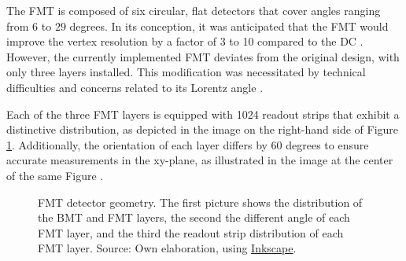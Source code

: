     The FMT is composed of six circular, flat detectors that cover angles ranging from $6$ to $29$ degrees.
    In its conception, it was anticipated that the FMT would improve the vertex resolution by a factor of 3 to 10 compared to the DC \cite{aune2009}.
    However, the currently implemented FMT deviates from the original design, with only three layers installed.
    This modification was necessitated by technical difficulties and concerns related to its Lorentz angle \cite{konczykowski2010}.

    Each of the three FMT layers is equipped with 1024 readout strips that exhibit a distinctive distribution, as depicted in the image on the right-hand side of Figure \ref{fig::12.10::fmt_geometry}.
    Additionally, the orientation of each layer differs by 60 degrees to ensure accurate measurements in the xy-plane, as illustrated in the image at the center of the same Figure \cite{acker2020mvt}.

    \begin{figure}[t]
        \centering{}
        \caption[FMT detector geometry.]{FMT detector geometry. The first picture shows the distribution of the BMT and FMT layers, the second the different angle of each FMT layer, and the third the readout strip distribution of each FMT layer.
        Source: Own elaboration, using \hyperlink{inkscape.org/}{Inkscape}.}
        \label{fig::12.10::fmt_geometry}
    \end{figure}

    

